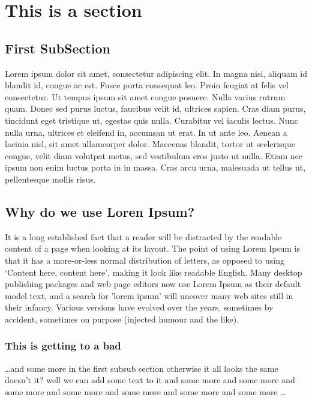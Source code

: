 \documentclass[11pt,times]{article}
\begin{document}
\normalsize

\section{This is a section} %

\subsection{First SubSection} %

Lorem ipsum dolor sit amet, consectetur adipiscing elit. In magna nisi, aliquam 
id blandit id, congue ac est. Fusce porta consequat leo. Proin feugiat at felis 
vel consectetur. Ut tempus ipsum sit amet congue posuere. Nulla varius rutrum 
quam. Donec sed purus luctus, faucibus velit id, ultrices sapien. Cras diam 
purus, tincidunt eget tristique ut, egestas quis nulla. Curabitur vel iaculis 
lectus. Nunc nulla urna, ultrices et eleifend in, accumsan ut erat. In ut ante 
leo. Aenean a lacinia nisl, sit amet ullamcorper dolor. Maecenas blandit, 
tortor ut scelerisque congue, velit diam volutpat metus, sed vestibulum eros 
justo ut nulla. Etiam nec ipsum non enim luctus porta in in massa. Cras arcu 
urna, malesuada ut tellus ut, pellentesque mollis risus.


\subsection{Why do we use Loren Ipsum?} %

It is a long established fact that a reader will be distracted by the readable 
content of a page when looking at its layout. The point of using Lorem Ipsum is 
that it has a more-or-less normal distribution of letters, as opposed to using 
`Content here, content here', making it look like readable English. Many 
desktop publishing packages and web page editors now use Lorem Ipsum as their 
default model text, and a search for 'lorem ipsum' will uncover many web sites 
still in their infancy. Various versions have evolved over the years, sometimes 
by accident, sometimes on purpose (injected humour and the like).


\subsubsection{This is getting to a bad} %
\dots and some more in the first subsub section otherwise it all looks the same
doesn't it? well we can add some text to it and some more and some more and
some more and some more and some more and some more and some more \dots
\end{document}
